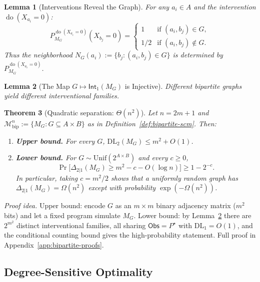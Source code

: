 \documentclass{article}
\theoremstyle{plain}
\newtheorem{theorem}{Theorem}[section]
\newtheorem{lemma}[theorem]{Lemma}
\theoremstyle{definition}
\newcommand{\calM}{\mathcal{M}}
\newcommand{\Obs}{\mathsf{Obs}}
\newcommand{\Int}{\mathsf{Int}}
\newcommand{\DL}{\mathrm{DL}}
\DeclareMathOperator{\doop}{do}
\begin{document}
\begin{lemma}[Interventions Reveal the Graph]
\label{lem:bipartite-intervention}
For any $a_i \in A$ and the intervention $\doop(X_{a_i} = 0)$:
\[
P_{M_G}^{\doop(X_{a_i} = 0)}(X_{b_j} = 0) = \begin{cases}
1 & \text{if } (a_i, b_j) \in G, \\
1/2 & \text{if } (a_i, b_j) \notin G.
\end{cases}
\]
Thus the neighborhood $N_G(a_i) := \{b_j : (a_i, b_j) \in G\}$ is determined by $P_{M_G}^{\doop(X_{a_i} = 0)}$.
\end{lemma}


\begin{lemma}[The Map $G \mapsto \Int_1(M_G)$ is Injective]
\label{lem:bipartite-injective}
Different bipartite graphs yield different interventional families.
\end{lemma}


\begin{theorem}[Quadratic separation: $\Theta(n^2)$]
\label{thm:quadratic-separation}
Let $n = 2m+1$ and $\calM_{\mathrm{bip}}^n := \{M_G : G \subseteq A \times B\}$ as in Definition~\ref{def:bipartite-scm}. Then:
\begin{enumerate}
    \item \textbf{Upper bound.} For every $G$, $\DL_2(M_G) \leq m^2 + O(1)$.
    \item \textbf{Lower bound.} For $G \sim \mathrm{Unif}(2^{A \times B})$ and every $c \geq 0$,
    \[
        \Pr\bigl[ \Delta_{2|1}(M_G) \geq m^2 - c - O(\log n) \bigr] \geq 1 - 2^{-c}.
    \]
    In particular, taking $c = m^2/2$ shows that a uniformly random graph has $\Delta_{2|1}(M_G) = \Omega(n^2)$ except with probability $\exp(-\Omega(n^2))$.
\end{enumerate}
\end{theorem}

\emph{Proof idea.} Upper bound: encode $G$ as an $m \times m$ binary adjacency matrix ($m^2$ bits) and let a fixed program simulate $M_G$. Lower bound: by Lemma~\ref{lem:bipartite-injective} there are $2^{m^2}$ distinct interventional families, all sharing $\Obs = P^\star$ with $\DL_1 = O(1)$, and the conditional counting bound gives the high-probability statement. Full proof in Appendix~\ref{app:bipartite-proofs}.



\subsection{Degree-Sensitive Optimality}
\label{sec:degree-optimality}
\end{document}

